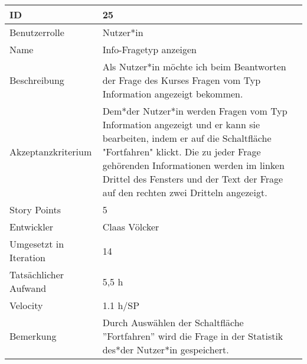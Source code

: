 \begin{tabularx}{\textwidth}{|p{}|X|}
	\hline
	ID & 25\\
	\hline
	Benutzerrolle & Nutzer*in\\
	\hline
	Name & Info-Fragetyp anzeigen\\
	\hline
	Beschreibung & Als Nutzer*in möchte ich beim Beantworten der Frage des Kurses Fragen vom Typ Information angezeigt bekommen.\\
	\hline
	Akzeptanzkriterium & Dem*der Nutzer*in werden Fragen vom Typ Information angezeigt und er kann sie bearbeiten, indem er auf die Schaltfläche "Fortfahren" klickt. Die zu jeder Frage gehörenden Informationen werden im linken Drittel des Fensters und der Text der Frage auf den rechten zwei Dritteln angezeigt.\\
	\hline
	Story Points & 5 \\
	\hline
	Entwickler & Claas Völcker \\
	\hline
	Umgesetzt in Iteration & 14\\
	\hline
	Tatsächlicher Aufwand & 5,5 h\\
	\hline
	Velocity & 1.1 h/SP\\
	\hline
	Bemerkung & Durch Auswählen der Schaltfläche ''Fortfahren'' wird die Frage in der Statistik des*der Nutzer*in gespeichert.\\
	\hline
\end{tabularx}
\vspace{20pt}
